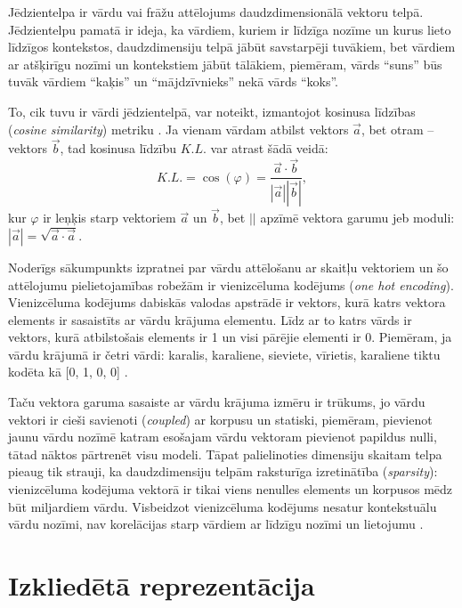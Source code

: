 Jēdzientelpa ir vārdu vai frāžu attēlojums daudzdimensionālā vektoru telpā. Jēdzientelpu pamatā ir ideja, ka vārdiem, kuriem ir līdzīga nozīme un kurus lieto līdzīgos kontekstos, daudzdimensiju telpā jābūt savstarpēji tuvākiem, bet vārdiem ar atšķirīgu nozīmi un kontekstiem jābūt tālākiem, piemēram, vārds “suns” būs tuvāk vārdiem “kaķis” un “mājdzīvnieks” nekā vārds “koks”.

To, cik tuvu ir vārdi jēdzientelpā, var noteikt, izmantojot kosinusa līdzības (\textit{cosine similarity}) metriku \cite{dangeti2017}. Ja vienam vārdam atbilst vektors $\vec{a}$, bet otram -- vektors $\vec{b}$, tad kosinusa līdzību $K.L.$ var atrast šādā veidā: $$K.L. = \cos(\varphi) = \frac{\vec{a} \cdot \vec{b}}{|\vec{a}| |\vec{b}|},$$ 
kur $\varphi$ ir leņķis starp vektoriem $\vec{a}$ un $\vec{b}$, bet $||$ apzīmē vektora garumu jeb moduli: $|\vec{a}| = \sqrt{\vec{a} \cdot \vec{a}}$.



Noderīgs sākumpunkts izpratnei par vārdu attēlošanu ar skaitļu vektoriem un šo attēlojumu pielietojamības robežām ir vienizcēluma kodējums (\textit{one hot encoding}). Vienizcēluma kodējums dabiskās valodas apstrādē ir vektors, kurā katrs vektora elements ir sasaistīts ar vārdu krājuma elementu. Līdz ar to katrs vārds ir vektors, kurā atbilstošais elements ir 1 un visi pārējie elementi ir 0. Piemēram, ja vārdu krājumā ir četri vārdi: karalis, karaliene, sieviete, vīrietis, karaliene tiktu kodēta kā [0, 1, 0, 0] \cite{colyer2016}.

Taču vektora garuma sasaiste ar vārdu krājuma izmēru ir trūkums, jo vārdu vektori ir cieši savienoti (\textit{coupled}) ar korpusu un statiski, piemēram, pievienot jaunu vārdu nozīmē katram esošajam vārdu vektoram pievienot papildus nulli, tātad nāktos pārtrenēt visu modeli. Tāpat palielinoties dimensiju skaitam telpa pieaug tik strauji, ka daudzdimensiju telpām raksturīga izretinātība (\textit{sparsity}): vienizcēluma kodējuma vektorā ir tikai viens nenulles elements un korpusos mēdz būt miljardiem 
vārdu. Visbeidzot vienizcēluma kodējums nesatur kontekstuālu vārdu nozīmi, nav korelācijas starp vārdiem ar līdzīgu nozīmi un lietojumu \cite{colyer2016}.


\section{Izkliedētā reprezentācija}

